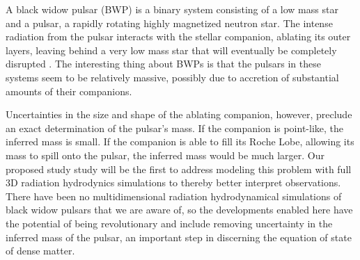 A black widow pulsar (BWP) is a binary system consisting of a low mass
star and a pulsar, a rapidly rotating highly magnetized neutron star.  
The intense radiation from the pulsar interacts with the stellar companion,
ablating its outer layers, leaving behind a very low mass star that 
will eventually be completely disrupted 
\cite [See][and references therein]{bednareksitarek2013}. The interesting 
thing about 
BWPs is that the pulsars in these systems seem to be relatively massive, 
possibly due to accretion of substantial amounts of their companions. 

Uncertainties in the size and shape of the ablating companion, however, 
preclude an exact determination of the pulsar's mass. If the companion is 
point-like, the inferred mass is small.  If the companion is able to fill 
its Roche Lobe, allowing its mass to spill onto the pulsar, the inferred 
mass would be much larger. Our proposed study study will be the first 
to address modeling this problem with full 3D radiation hydrodynics
simulations to thereby better interpret observations. There have been 
no multidimensional radiation hydrodynamical simulations 
of black widow pulsars that we are aware of, so the developments enabled 
here have the potential of being revolutionary and include removing
uncertainty in the inferred mass of the pulsar, an important step
in discerning the equation of state of dense matter.


